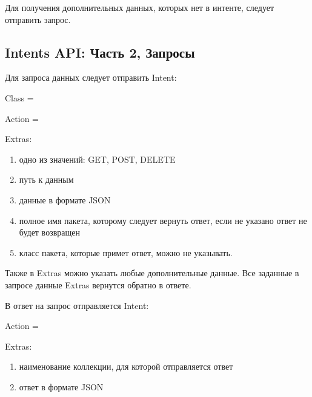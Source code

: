 \documentclass[a4paper,10pt,russian]{sphinxmanual}
\begin{document}
\sphinxAtStartPar
Для получения дополнительных данных, которых нет в интенте, следует отправить запрос.


\subsection{Intents API: Часть 2, Запросы}
\label{\detokenize{api:intents-api-2}}
\sphinxAtStartPar
Для запроса данных следует отправить Intent:

\sphinxAtStartPar
Class = 

\sphinxAtStartPar
Action = 

\sphinxAtStartPar
Extras:
\begin{enumerate}
%
\item {} 
\sphinxAtStartPar
{} \sphinxhyphen{} одно из значений: GET, POST, DELETE

\item {} 
\sphinxAtStartPar
{} \sphinxhyphen{} путь к данным

\item {} 
\sphinxAtStartPar
{} \sphinxhyphen{} данные в формате JSON

\item {} 
\sphinxAtStartPar
{} \sphinxhyphen{} полное имя пакета, которому следует вернуть ответ, если не указано \sphinxhyphen{} ответ не будет возвращен

\item {} 
\sphinxAtStartPar
{} \sphinxhyphen{} класс пакета, которые примет ответ, можно не указывать.

\end{enumerate}

\sphinxAtStartPar
Также в Extras можно указать любые дополнительные данные. Все заданные в запросе данные Extras вернутся обратно  в ответе.

\sphinxAtStartPar
В ответ на запрос отправляется Intent:

\sphinxAtStartPar
Action = 

\sphinxAtStartPar
Extras:
\begin{enumerate}
%
\item {} 
\sphinxAtStartPar
{} \sphinxhyphen{} наименование коллекции, для которой отправляется ответ

\item {} 
\sphinxAtStartPar
{} \sphinxhyphen{} ответ в формате JSON

\end{enumerate}
\end{document}
